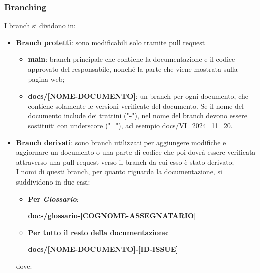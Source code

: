 \subsubsection{Branching}\label{inf:branch}
I branch si dividono in:
\begin{itemize}
      \item \textbf{Branch protetti}: sono modificabili solo tramite pull request
            \begin{itemize}
                  \item \textbf{main}: branch principale che contiene la documentazione e il codice approvato del responsabile,
                        nonché la parte che viene mostrata sulla pagina web;
                  \item \textbf{docs/[NOME-DOCUMENTO]}: un branch per ogni documento, che contiene solamente le versioni verificate del documento.
                        Se il nome del documento include dei trattini ("-"), nel nome del branch devono essere sostituiti con underscore ("\_"),
                        ad esempio docs/VI\_2024\_11\_20.
            \end{itemize}
      \item \textbf{Branch derivati}: sono branch utilizzati per aggiungere modifiche e aggiornare un documento o una parte di codice che poi dovrà essere verificata
            attraverso una pull request verso il branch da cui esso è stato derivato;\\
            I nomi di questi branch, per quanto riguarda la documentazione, si suddividono in due casi:
            \begin{itemize}
                  \item \textbf{Per \textit{Glossario}}:
                        \begin{center}
                              \textbf{docs/glossario-[COGNOME-ASSEGNATARIO]}
                        \end{center}
                  \item \textbf{Per tutto il resto della documentazione}:
                        \begin{center}
                              \textbf{docs/[NOME-DOCUMENTO]-[ID-ISSUE]}
                        \end{center}
            \end{itemize}
            dove:


\end{itemize}
